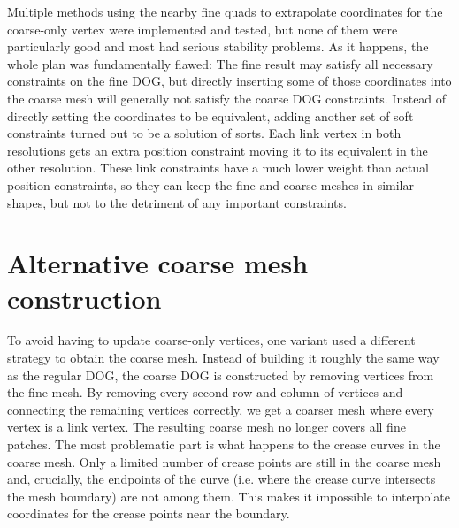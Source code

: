 \documentclass[a4paper,twoside,12pt,nochapterprefix]{scrbook}
\begin{document}
Multiple methods using the nearby fine quads to extrapolate coordinates for the coarse-only vertex were implemented and tested, but none of them were particularly good and most had serious stability problems. As it happens, the whole plan was fundamentally flawed: The fine result may satisfy all necessary constraints on the fine DOG, but directly inserting some of those coordinates into the coarse mesh will generally not satisfy the coarse DOG constraints.\newline
Instead of directly setting the coordinates to be equivalent, adding another set of soft constraints turned out to be a solution of sorts. Each link vertex in both resolutions gets an extra position constraint moving it to its equivalent in the other resolution. These link constraints have a much lower weight than actual position constraints, so they can keep the fine and coarse meshes in similar shapes, but not to the detriment of any important constraints.\newline
\section{Alternative coarse mesh construction}\label{sec:coarse_construction_alt}
To avoid having to update coarse-only vertices, one variant used a different strategy to obtain the coarse mesh. Instead of building it roughly the same way as the regular DOG, the coarse DOG is constructed by removing vertices from the fine mesh. By removing every second row and column of vertices and connecting the remaining vertices correctly, we get a coarser mesh where every vertex is a link vertex.\newline
The resulting coarse mesh no longer covers all fine patches. The most problematic part is what happens to the crease curves in the coarse mesh. Only a limited number of crease points are still in the coarse mesh and, crucially, the endpoints of the curve (i.e. where the crease curve intersects the mesh boundary) are not among them. This makes it impossible to interpolate coordinates for the crease points near the boundary.\newline
\end{document}
